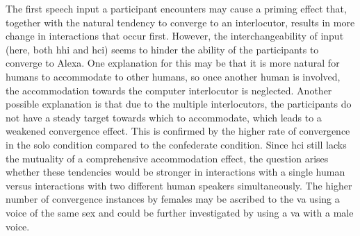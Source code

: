 The first speech input a participant encounters may cause a priming effect that, together with the natural tendency to converge to an interlocutor, results in more change in interactions that occur first.
However, the interchangeability of input (here, both \ac{hhi} and \ac{hci}) seems to hinder the ability of the participants to converge to Alexa.
One explanation for this may be that it is more natural for humans to accommodate to other humans, so once another human is involved, the accommodation towards the computer interlocutor is neglected.
Another possible explanation is that due to the multiple interlocutors, the participants do not have a steady target towards which to accommodate, which leads to a weakened convergence effect.
This is confirmed by the higher rate of convergence in the solo condition compared to the confederate condition.
Since \ac{hci} still lacks the mutuality of a comprehensive accommodation effect, the question arises whether these tendencies would be stronger in interactions with a single human versus interactions with two different human speakers simultaneously.
The higher number of convergence instances by females may be ascribed to the \ac{va} using a voice of the same sex and could be further investigated by using a \ac{va} with a male voice.

